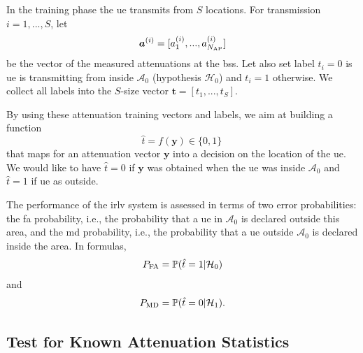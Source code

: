 \documentclass[conference,draftcls,onecolumn]{IEEEtran}
\begin{document}
In the training phase the \ac{ue} transmits from $S$ locations. For transmission $i=1,...,S$, let
\begin{equation}
    \bm{a}^{(i)}=[a_1^{(i)},...,a_{N_{\rm AP}}^{(i)}]
\end{equation}
be the vector of the measured attenuations at the  \acp{bs}. Let also set label $t_i=0$ is \ac{ue} is transmitting from inside $\mathcal{A}_0$ (hypothesis $\mathcal{H}_0$) and $t_i=1$ otherwise. We collect all labels into the $S$-size vector $\bm{t}=[t_1,...,t_S]$.

By using these attenuation training vectors and labels, we aim at building a function
\begin{equation}
    \hat{t} = f(\bm{y}) \in \{0,1\}\,
\end{equation}
that maps for an attenuation vector $\bm{y}$ into a decision on the location of the \ac{ue}. We would like to have $\hat{t}=0$ if $\bm{y}$ was obtained when the \ac{ue} was inside $\mathcal{A}_0$ and $\hat{t}=1$ if \ac{ue} as outside.

The performance of the \ac{irlv} system is assessed in terms of two error probabilities: the \ac{fa} probability, i.e., the probability  that a \ac{ue} in $\mathcal A_0$ is declared outside this area, and the \ac{md} probability, i.e., the probability that a \ac{ue} outside $\mathcal A_0$ is declared inside the area. In formulas, 
\begin{equation}
P_{\rm FA} ={\mathbb P}(\hat{t} =1 | \mathcal H_0) \end{equation} 
and  
\begin{equation}
 P_{\rm MD}={\mathbb P}(\hat{t} = 0 | \mathcal H_1).   
\end{equation}


\subsection{Test for Known Attenuation Statistics}
\end{document}
